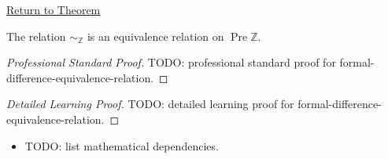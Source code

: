 \newpage
{}
\label{prf:formal-difference-equivalence-relation}

\begin{remark*}[Return]
\hyperref[thm:formal-difference-equivalence-relation]{Return to Theorem}
\end{remark*}

\begin{theorem*}
The relation $\sim_{\mathbb{Z}}$ is an equivalence relation on
$\operatorname{Pre}\mathbb{Z}$.
\end{theorem*}

\begin{proof}[Professional Standard Proof]
\LRAProofBodyStart
TODO: professional standard proof for formal-difference-equivalence-relation.
\end{proof}

\begin{proof}[Detailed Learning Proof]
\LRAProofBodyStart
TODO: detailed learning proof for formal-difference-equivalence-relation.
\end{proof}

\begin{remark*}
\end{remark*}

\begin{dependencies}
\begin{itemize}
  \item TODO: list mathematical dependencies.
\end{itemize}
\end{dependencies}

\clearpage
